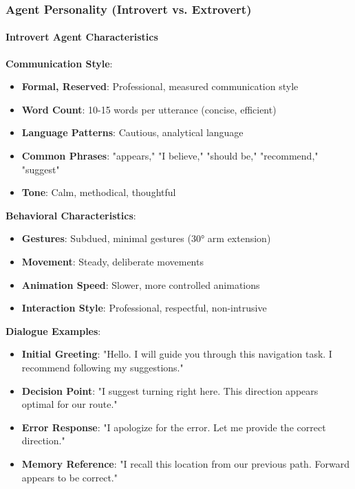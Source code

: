 \documentclass[12pt]{article}
\begin{document}
\subsubsection{Agent Personality (Introvert vs. Extrovert)}

\paragraph{Introvert Agent Characteristics}

\textbf{Communication Style}:
\begin{itemize}
    \item \textbf{Formal, Reserved}: Professional, measured communication style
    \item \textbf{Word Count}: 10-15 words per utterance (concise, efficient)
    \item \textbf{Language Patterns}: Cautious, analytical language
    \item \textbf{Common Phrases}: "appears," "I believe," "should be," "recommend," "suggest"
    \item \textbf{Tone}: Calm, methodical, thoughtful
\end{itemize}

\textbf{Behavioral Characteristics}:
\begin{itemize}
    \item \textbf{Gestures}: Subdued, minimal gestures (30° arm extension)
    \item \textbf{Movement}: Steady, deliberate movements
    \item \textbf{Animation Speed}: Slower, more controlled animations
    \item \textbf{Interaction Style}: Professional, respectful, non-intrusive
\end{itemize}

\textbf{Dialogue Examples}:
\begin{itemize}
    \item \textbf{Initial Greeting}: "Hello. I will guide you through this navigation task. I recommend following my suggestions."
    \item \textbf{Decision Point}: "I suggest turning right here. This direction appears optimal for our route."
    \item \textbf{Error Response}: "I apologize for the error. Let me provide the correct direction."
    \item \textbf{Memory Reference}: "I recall this location from our previous path. Forward appears to be correct."
\end{itemize}
\end{document}
